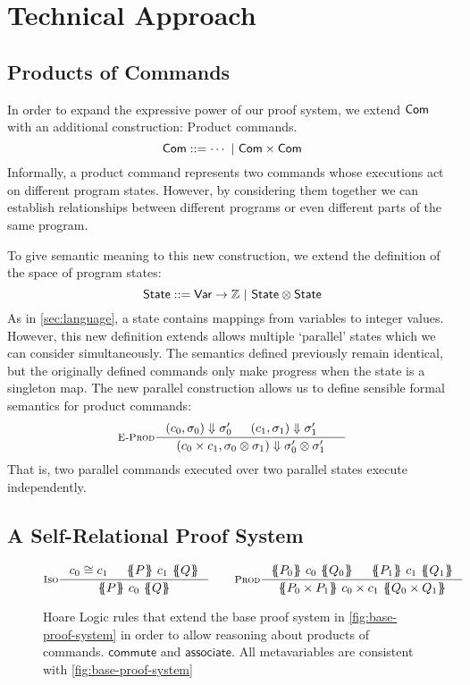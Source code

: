\documentclass[p.tex]{subfiles}
\begin{document}
\section{Technical Approach}\label{sec:approach}
\subsection{Products of Commands}\label{sec:product-com}
In order to expand the expressive power of our proof system, we extend
$\textsf{Com}$ with an additional construction: Product commands.
\[ \textsf{Com} ::= \cdots~|~\textsf{Com}\times\textsf{Com} \]
Informally,
a product command represents two commands whose executions act on
different program states. However, by considering them together we can
establish relationships between different programs or even different
parts of the same program.

To give semantic meaning to this new construction, we extend the
definition of the space of program states:
\[\textsf{State} ::= \textsf{Var} \rightarrow \mathbb{Z}~|~\textsf{State}\otimes\textsf{State}\]
As in \cref{sec:language}, a state contains mappings from variables to integer
values. However, this new definition extends allows multiple
`parallel' states which we can consider simultaneously. The semantics
defined previously remain identical, but the originally defined
commands only make progress when the state is a singleton map. The new
parallel construction allows us to define sensible formal semantics for
product commands:
\begin{align*}
  \inference[\textsc{E-Prod}]{%
    \ceval{c_0}{\sigma_0}{\sigma_0'}&
    \ceval{c_1}{\sigma_1}{\sigma_1'}&
  }{%
    \ceval{\cprod{c_0}{c_1}}{\sprod{\sigma_0}{\sigma_1}}{\sprod{\sigma_0'}{\sigma_1'}}
  }
\end{align*}
That is, two parallel commands executed over two parallel states
execute independently.

\subsection{A Self-Relational Proof System}
\begin{figure}
\begin{spreadlines}{5pt}
\begin{gather*}
  \inference[\textsc{Iso}]{%
    c_0 \cong c_1&
    \hoare{P}{c_1}{Q}
  }{%
    \hoare{P}{c_0}{Q}
  }
  \qquad
  \inference[\textsc{Prod}]{%
    \hoare{P_0}{c_0}{Q_0}&
    \hoare{P_1}{c_1}{Q_1}
  }{%
    \hoare{P_0 \times P_1}{c_0 \times c_1}{Q_0 \times Q_1}
  }
\end{gather*}
\end{spreadlines}
\caption{%
  Hoare Logic rules that extend the base proof system in
  \cref{fig:base-proof-system} in order to allow reasoning about
  products of commands.
  $\textsf{commute}$ and $\textsf{associate}$.
  All metavariables are consistent with \cref{fig:base-proof-system}
}\label{fig:proof-rules}
\end{figure}
\end{document}
